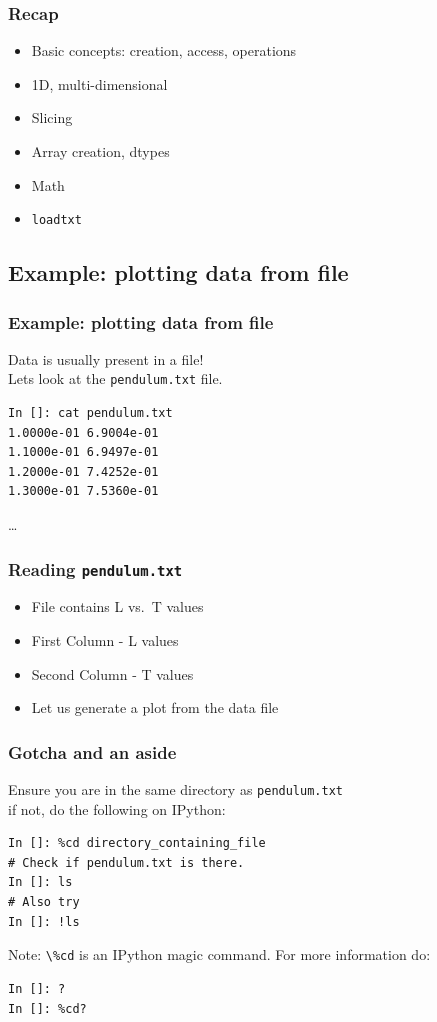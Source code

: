 \documentclass[14pt,compress]{beamer}
\newcounter{time}
\newcommand{\inctime}[1]{\addtocounter{time}{#1}{\tiny \thetime\ m}}
\newcommand{\typ}[1]{\lstinline{#1}}
\begin{document}
\begin{frame}[fragile]
  \frametitle{Recap}
  \begin{itemize}
      \item Basic concepts: creation, access, operations
      \item 1D, multi-dimensional
      \item Slicing
      \item Array creation, dtypes
      \item Math
      \item \typ{loadtxt}
      \end{itemize}
      \inctime{5}
\end{frame}

\subsection{Example: plotting data from file}

\begin{frame}[fragile]
\frametitle{Example: plotting data from file}
\alert{Data is usually present in a file!} \\
Lets look at the \typ{pendulum.txt} file.
\begin{lstlisting}
In []: cat pendulum.txt
1.0000e-01 6.9004e-01
1.1000e-01 6.9497e-01
1.2000e-01 7.4252e-01
1.3000e-01 7.5360e-01
\end{lstlisting}
\ldots
\end{frame}

\begin{frame}[fragile]
\frametitle{Reading \typ{pendulum.txt}}
\begin{itemize}
  \item File contains L vs.\ T values
  \item First Column - L values
  \item Second Column - T values
  \item Let us generate a plot from the data file
\end{itemize}
\end{frame}

\begin{frame}[fragile]
    \frametitle{Gotcha and an aside}
    Ensure you are in the same directory as \typ{pendulum.txt}\\
    if not, do the following on IPython:
    \begin{lstlisting}
In []: %cd directory_containing_file
# Check if pendulum.txt is there.
In []: ls
# Also try
In []: !ls
    \end{lstlisting}

    \alert{Note:} \typ{\%cd} is an IPython magic command.  For more information
    do:
    \begin{lstlisting}
In []: ?
In []: %cd?
    \end{lstlisting}
\end{frame}
\end{document}
